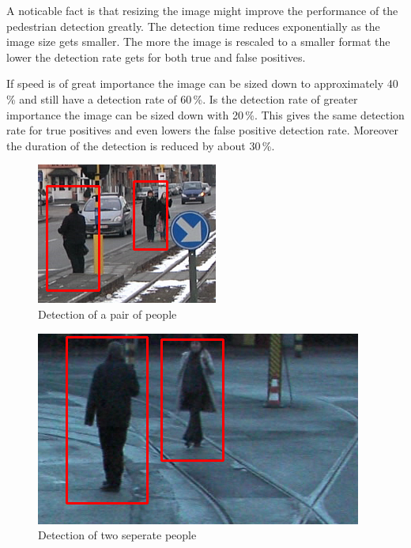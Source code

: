 \documentclass{article}
\begin{document}
\par
A noticable fact is that resizing the image might improve the performance of the pedestrian detection greatly. The detection time reduces exponentially as the image size gets smaller. The more the image is rescaled to a smaller format the lower the detection rate gets for both true and false positives.
\par
If speed is of great importance the image can be sized down to approximately 40\,\% and still have a detection rate of 60\,\%. Is the detection rate of greater importance the image can be sized down with 20\,\%. This gives the same detection rate for true positives and even lowers the false positive detection rate. Moreover the duration of the detection is reduced by about 30\,\%.
\begin{table}
\centering
{}
\caption{Test results when resizing the image}
\label{table:test}
\end{table}
\begin{figure}[h!]
	\centering
	\includegraphics[scale=0.75]{peopledetection1.png}
	\caption{Detection of a pair of people}
	\label{fig:pdetection1}
\end{figure}
\begin{figure}[h!]
	\centering
	\includegraphics[scale=0.5]{peopledetection2.png}
	\caption{Detection of two seperate people}
	\label{fig:pdetection2}
\end{figure}
\end{document}
